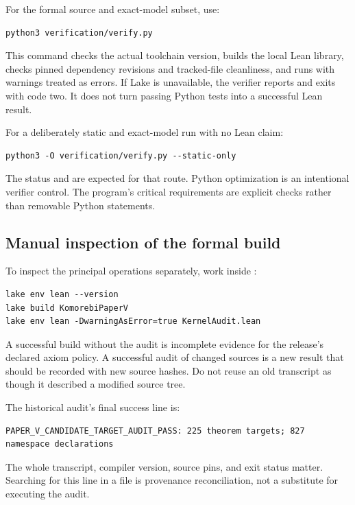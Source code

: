 For the formal source and exact-model subset, use:
\begin{Verbatim}[fontsize=\small,frame=leftline,breaklines=true]
python3 verification/verify.py
\end{Verbatim}
This command checks the actual toolchain version, builds the local Lean library, checks pinned dependency revisions and tracked-file cleanliness, and runs  with warnings treated as errors. If Lake is unavailable, the verifier reports  and exits with code two. It does not turn passing Python tests into a successful Lean result.

For a deliberately static and exact-model run with no Lean claim:
\begin{Verbatim}[fontsize=\small,frame=leftline,breaklines=true]
python3 -O verification/verify.py --static-only
\end{Verbatim}
The  status and  are expected for that route. Python optimization is an intentional verifier control. The program's critical requirements are explicit checks rather than removable Python  statements.

\subsection{Manual inspection of the formal build}
To inspect the principal operations separately, work inside :
\begin{Verbatim}[fontsize=\small,frame=leftline,breaklines=true]
lake env lean --version
lake build KomorebiPaperV
lake env lean -DwarningAsError=true KernelAudit.lean
\end{Verbatim}
A successful build without the audit is incomplete evidence for the release's declared axiom policy. A successful audit of changed sources is a new result that should be recorded with new source hashes. Do not reuse an old transcript as though it described a modified source tree.

The historical audit's final success line is:
\begin{Verbatim}[fontsize=\small,frame=leftline,breaklines=true]
PAPER_V_CANDIDATE_TARGET_AUDIT_PASS: 225 theorem targets; 827 namespace declarations
\end{Verbatim}
The whole transcript, compiler version, source pins, and exit status matter. Searching for this line in a file is provenance reconciliation, not a substitute for executing the audit.

